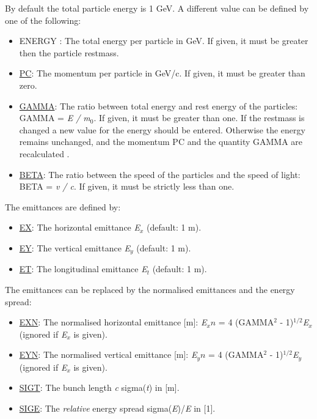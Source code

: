 By default the total particle energy is 1 GeV. A different value can be 
defined by one of the following: 
 
\begin{itemize}
   \item ENERGY \label{beam_energy}: The total energy per particle in
     GeV. If given, it must be greater then the particle restmass.  
   \item \href{pc}{PC}: The momentum per particle in GeV/c. If
     given, it must be greater than zero.  
   \item \href{gamma}{GAMMA}: The ratio between total energy and
     rest energy of the particles: GAMMA = \textit{E / m$_0$}. If
     given, it must be greater than one. If the restmass is changed
     a new value for the energy should be entered. Otherwise the
     energy remains unchanged, and the momentum PC and the quantity
     GAMMA are recalculated . 
   \item \href{beta}{BETA}: The ratio between the speed of the particles
     and the speed of light: BETA = \textit{v / c}. If
     given, it must be strictly less than one.
\end{itemize}  

The emittances are defined by: 
\begin{itemize}
   \item \href{ex}{EX}: The horizontal emittance \textit{E$_x$} (default: 1 m). 
   \item \href{ey}{EY}: The vertical emittance \textit{E$_y$} (default: 1 m). 
   \item \href{et}{ET}: The longitudinal emittance \textit{E$_t$} (default: 1 m). 
\end{itemize}  

The emittances can be replaced by the normalised emittances and the
energy spread:  
\begin{itemize}
   \item \href{exn}{EXN}: The normalised horizontal emittance [m]:
     \textit{E$_xn$} = 4 (GAMMA$^2$ - 1)$^{1/2}$\textit{E$_x$} (ignored
     if \textit{E$_x$} is given).  
   \item \href{eyn}{EYN}: The normalised vertical emittance [m]:
     \textit{E$_yn$} = 4 (GAMMA$^2$ - 1)$^{1/2}$\textit{E$_y$} (ignored
     if \textit{E$_x$} is given).  
   \item \href{sigt}{SIGT}: The bunch length \textit{c}
     sigma(\textit{t}) in [m].  
   \item \href{sige}{SIGE}: The \emph{relative} energy spread
     sigma(\textit{E})/\textit{E} in [1].  
\end{itemize} 

